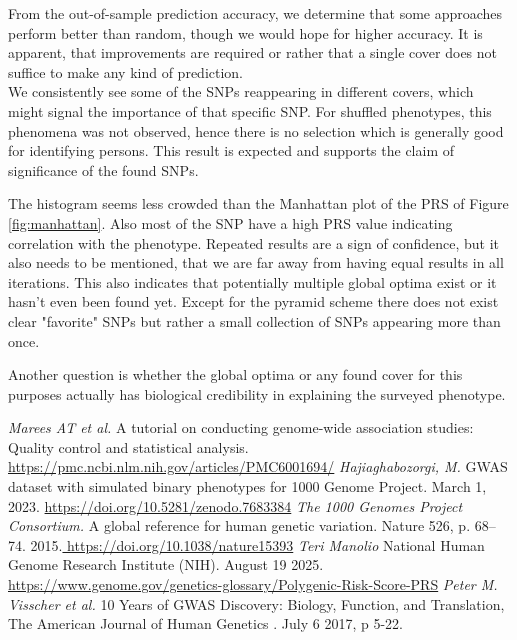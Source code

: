 \documentclass[letterpaper, 11pt]{article}
\begin{document}
From the out-of-sample prediction accuracy, we determine that some approaches perform better than random, though we would hope for higher accuracy. It is apparent, that improvements are required or rather that a single cover does not suffice to make any kind of prediction.\\

We consistently see some of the SNPs reappearing in different covers, which might signal the importance of that specific SNP. For shuffled phenotypes, this phenomena was not observed, hence there is no selection which is generally good for identifying persons. 
This result is expected and supports the claim of significance of the found SNPs.

The histogram seems less crowded than the Manhattan plot of the PRS of Figure \ref{fig:manhattan}. Also most of the SNP have a high PRS value indicating correlation with the phenotype. Repeated results are a sign of confidence, but it also needs to be mentioned, that we are far away from having equal results in all iterations. This also indicates that potentially multiple global optima exist or it hasn't even been found yet.  Except for  the pyramid scheme there does not exist clear "favorite" SNPs but rather a small collection of SNPs appearing more than once.

Another question is whether the global optima or any found cover for this purposes actually has biological credibility in explaining the surveyed phenotype. 

\newpage
\begin{thebibliography}{99}
\emph{Marees AT et al. } A tutorial on conducting genome-wide association studies: Quality control and statistical analysis. \url{https://pmc.ncbi.nlm.nih.gov/articles/PMC6001694/}
\emph{Hajiaghabozorgi, M. } GWAS dataset with simulated binary phenotypes for 1000 Genome Project. March 1, 2023. \url{https://doi.org/10.5281/zenodo.7683384}
\emph{The 1000 Genomes Project Consortium.} A global reference for human genetic variation. Nature 526, p. 68–74. 2015.\url{ https://doi.org/10.1038/nature15393}
\emph{Teri Manolio} National Human Genome Research Institute (NIH). August 19 2025. \url{https://www.genome.gov/genetics-glossary/Polygenic-Risk-Score-PRS}
\emph{Peter M. Visscher et al. } 10 Years of GWAS Discovery: Biology, Function, and Translation, The American Journal of Human Genetics . July 6 2017, p 5-22. 
\end{thebibliography}
\end{document}
